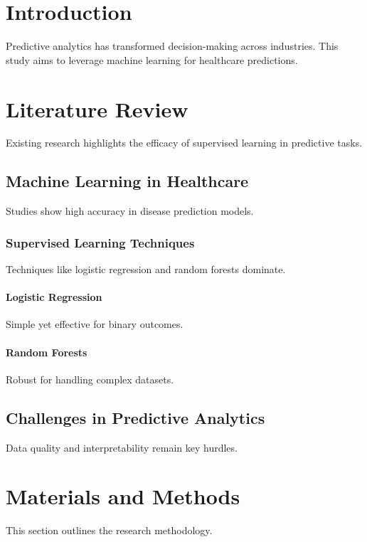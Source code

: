 \documentclass[12pt,a4paper]{article}
\begin{document}
\setcounter{page}{1}
\renewcommand{\thepage}{\arabic{page}}

\section{Introduction}
Predictive analytics has transformed decision-making across industries. This study aims to leverage machine learning for healthcare predictions.

\section{Literature Review}
Existing research highlights the efficacy of supervised learning in predictive tasks.

\subsection{Machine Learning in Healthcare}
Studies show high accuracy in disease prediction models.

\subsubsection{Supervised Learning Techniques}
Techniques like logistic regression and random forests dominate.

\paragraph{Logistic Regression}
Simple yet effective for binary outcomes.

\paragraph{Random Forests}
Robust for handling complex datasets.

\subsection{Challenges in Predictive Analytics}
Data quality and interpretability remain key hurdles.

\section{Materials and Methods}
This section outlines the research methodology.
\end{document}
